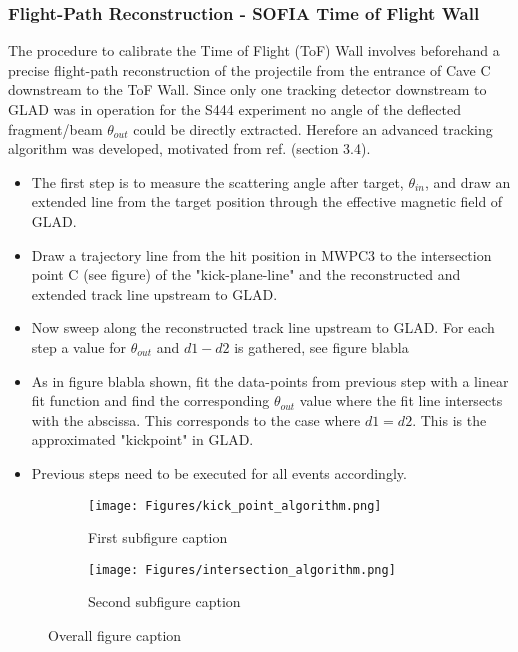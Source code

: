 \subsubsection{Flight-Path Reconstruction - SOFIA Time of Flight Wall}
The procedure to calibrate the Time of Flight (ToF) Wall involves beforehand a precise flight-path reconstruction of the projectile from the entrance of Cave C downstream to the ToF Wall. Since only one tracking detector downstream to GLAD was in operation for the S444 experiment no angle of the deflected fragment/beam $\theta_{out}$ could be directly extracted. Herefore an advanced tracking algorithm was developed, motivated from ref. \cite{bertini2013study} (section 3.4). 
\begin{itemize}
\item The first step is to measure the scattering angle after target, $\theta_{in}$, and draw an extended line from the target position through the effective magnetic field of GLAD.  
\item Draw a trajectory line from the hit position in MWPC3 to the intersection point C (see figure) of the "kick-plane-line" and the reconstructed and extended track line upstream to GLAD.
\item Now sweep along the reconstructed track line upstream to GLAD. For each step a value for $\theta_{out}$ and $d1-d2$ is gathered, see figure blabla
\item As in figure blabla shown, fit the data-points from previous step with a linear fit function and find the corresponding $\theta_{out}$ value where the fit line intersects with the abscissa. This corresponds to the case where $d1 = d2$. This is the approximated "kickpoint" in GLAD. 
\item Previous steps need to be executed for all events accordingly.
\end{itemize}
\begin{figure}[ht]
    \centering
    \begin{subfigure}[b]{0.45\textwidth}
        \texttt{[image: Figures/kick\_point\_algorithm.png]}
        \caption{First subfigure caption}
        \label{fig:sub1}
    \end{subfigure}
    \hfill %
    \begin{subfigure}[b]{0.45\textwidth}
        \texttt{[image: Figures/intersection\_algorithm.png]}
        \caption{Second subfigure caption}
        \label{fig:sub2}
    \end{subfigure}

    \caption{Overall figure caption}
    \label{fig:overall}
\end{figure}
